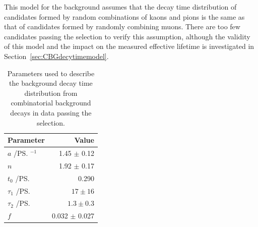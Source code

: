 This model for the background assumes that the decay time distribution of \bhh candidates formed by random combinations of kaons and pions is the same as that of \bsmumu candidates formed by randomly combining muons. There are too few candidates passing the \bsmumu selection to verify this assumption, although the validity of this model and the impact on the measured \bsmumu effective lifetime is investigated in Section~\ref{sec:CBGdecytimemodel}.%


\begin{table}[tbp]
\begin{center}
\begin{tabular}{lr}
\toprule \toprule
Parameter & Value \\
\midrule
$a$ /\ps$^{-1}$ & 1.45 $\pm$ 0.12\\
$n$ & 1.92 $\pm$ 0.17 \\
$t_{0}$ /\ps & 0.290 \\
$\tau_{1}$ /\ps & $17 \pm 16$  \\ 
$\tau_{2}$ /\ps & $1.3 \pm 0.3$ \\
$f$ & 0.032 $\pm$ 0.027 \\
\bottomrule \bottomrule
\end{tabular}
\vspace{0.7cm}             
\caption{Parameters used to describe the background decay time distribution from combinatorial background decays in data passing the \bhh selection.}
\label{tab:bkgparams}
\end{center}
\vspace{-1.0cm}                                                                                                                                               
\end{table}

